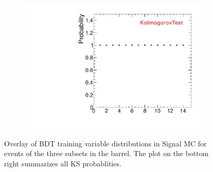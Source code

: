\begin{figure}
\begin{subfigure}[b]{0.2\textwidth}
                \includegraphics[width=\textwidth]{Figures/VariablesComparison/MC_barrel_figs_3h/KS}
                \label{fig:MC_barrel_KS_3h}
        \end{subfigure}
        \caption{Overlay of BDT training variable distributions in Signal MC for events of the three subsets in the barrel. The plot on the bottom right summarizes all KS probablities.}
        \label{fig:MC_barrel_figs_3h}
\end{figure}



